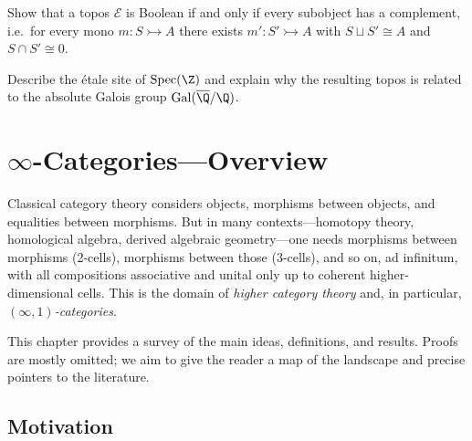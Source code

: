 \begin{exercise}\label{ex:boolean-topos}
Show that a topos $\mathcal{E}$ is Boolean if and only if every subobject
has a complement, i.e.\ for every mono $m\colon S\rightarrowtail A$
there exists $m'\colon S'\rightarrowtail A$ with $S\sqcup S'\cong A$
and $S\cap S'\cong 0$.
\end{exercise}

\begin{exercise}\label{ex:etale-site}
Describe the \'etale site of $\mathrm{Spec}(\Z)$ and explain why
the resulting topos is related to the absolute Galois group
$\mathrm{Gal}(\overline{\Q}/\Q)$.
\end{exercise}




\chapter{$\infty$-Categories---Overview}\label{ch:infinity-cats}
\minitoc

\vspace{1em}

Classical category theory considers objects, morphisms between objects,
and equalities between morphisms.  But in many contexts---homotopy theory,
homological algebra, derived algebraic geometry---one needs morphisms
between morphisms (2-cells), morphisms between those (3-cells), and so on,
ad infinitum, with all compositions associative and unital only up to
coherent higher-dimensional cells.  This is the domain of
\emph{higher category theory} and, in particular,
\emph{$(\infty,1)$-categories}.

This chapter provides a survey of the main ideas, definitions, and
results.  Proofs are mostly omitted; we aim to give the reader a map
of the landscape and precise pointers to the literature.


\section{Motivation}\label{sec:infty-motivation}

